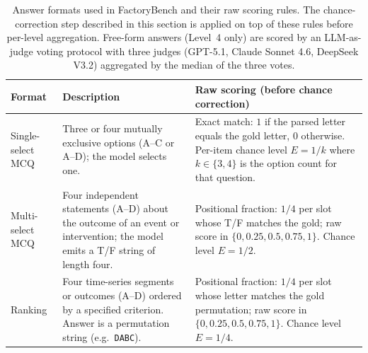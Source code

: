 \begin{table}[htbp]
    \centering
    \caption{Answer formats used in FactoryBench and their raw scoring rules. The chance-correction step described in this section is applied on top of these rules before per-level aggregation. Free-form answers (Level~4 only) are scored by an LLM-as-judge voting protocol with three judges (GPT-5.1, Claude Sonnet 4.6, DeepSeek V3.2) aggregated by the median of the three votes.}
    \label{tab:answer_formats}
    \small
    \setlength{\tabcolsep}{4pt}
    \begin{tabular}{@{}l p{4.6cm} p{6.2cm}@{}}
        \toprule
        \textbf{Format}   & \textbf{Description}                                                                                                                 & \textbf{Raw scoring (before chance correction)}                                                                                                                                                                                                                                                                          \\
        \midrule
        Single-select MCQ & Three or four mutually exclusive options (A--C or A--D); the model selects one.                                                      & Exact match: $1$ if the parsed letter equals the gold letter, $0$ otherwise. Per-item chance level $E=1/k$ where $k\in\{3,4\}$ is the option count for that question.                                                                                                                                                    \\
        \addlinespace
        Multi-select MCQ  & Four independent statements (A--D) about the outcome of an event or intervention; the model emits a T/F string of length four.       & Positional fraction: $1/4$ per slot whose T/F matches the gold; raw score in $\{0, 0.25, 0.5, 0.75, 1\}$. Chance level $E=1/2$.                                                                                                                                                                                          \\
        \addlinespace
        Ranking           & Four time-series segments or outcomes (A--D) ordered by a specified criterion. Answer is a permutation string (e.g.\ \texttt{DABC}). & Positional fraction: $1/4$ per slot whose letter matches the gold permutation; raw score in $\{0, 0.25, 0.5, 0.75, 1\}$. Chance level $E=1/4$.                                                                                                                                                                           \\

\end{tabular}
\end{table}
